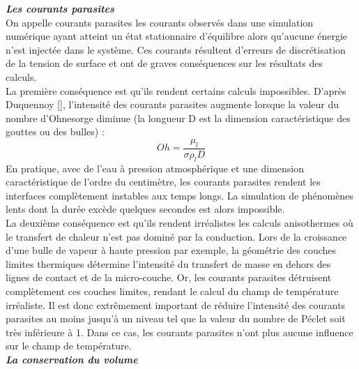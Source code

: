 \textit{\textbf{Les courants parasites}}\smallskip \\

On appelle courants parasites les courants observ\'es dans une simulation num\'erique ayant atteint un \'etat stationnaire d’\'equilibre alors qu’aucune \'energie n’est inject\'ee dans le système. Ces courants r\'esultent d’erreurs de discr\'etisation de la tension de surface et ont de graves cons\'equences sur les r\'esultats des calculs.\\
La première cons\'equence est qu’ils rendent certains calculs impossibles. D’après Duquennoy [\cite{Duquennoy2000}], l’intensit\'e des courants parasites augmente lorsque la valeur du nombre d’Ohnesorge diminue (la longueur D est la dimension caract\'eristique des gouttes ou des bulles) :
\begin{equation}
Oh = \dfrac{\mu_{l}}{\sigma \rho_{l} D}
\end{equation}
En pratique, avec de l’eau à pression atmosph\'erique et une dimension caract\'eristique de l’ordre du centim\`etre, les courants parasites rendent les interfaces compl\`etement instables aux temps longs. La simulation de ph\'enomènes lents dont la dur\'ee exc\`ede quelques secondes est alors impossible.\\
La deuxi\`eme cons\'equence est qu’ils rendent irr\'ealistes les calculs anisothermes o\`u le transfert de chaleur n’est pas domin\'e par la conduction. Lors de la croissance d’une bulle de vapeur à haute pression par exemple, la g\'eom\'etrie des couches limites thermiques d\'etermine l’intensit\'e du transfert de masse en dehors des lignes de contact et de la micro-couche. Or, les courants parasites d\'etruisent complètement ces couches limites, rendant le calcul du champ de temp\'erature irr\'ealiste.
Il est donc extr\^emement important de r\'eduire l’intensit\'e des courants parasites au moins jusqu’à un niveau tel que la valeur du nombre de P\'eclet soit très inf\'erieure à 1. Dans ce cas, les courants parasites n’ont plus aucune influence sur le champ de temp\'erature.\smallskip \\

\textit{\textbf{La conservation du volume}}\smallskip \\

